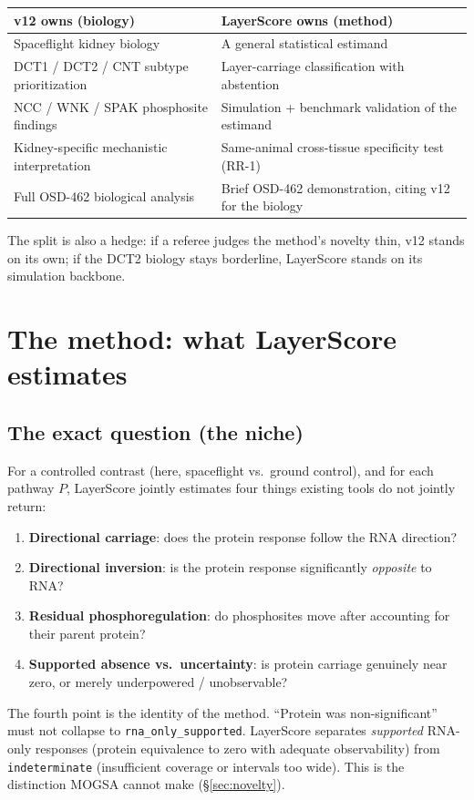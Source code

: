 \documentclass[11pt]{article}
\newcommand{\Crna}{\texttt{rna\_only\_supported}}
\newcommand{\Cind}{\texttt{indeterminate}}
\begin{document}
\begin{center}\small
\begin{tabularx}{\textwidth}{@{}L L@{}}
\toprule
\textbf{v12 owns (biology)} & \textbf{LayerScore owns (method)} \\
\midrule
Spaceflight kidney biology & A general statistical estimand \\
DCT1 / DCT2 / CNT subtype prioritization & Layer-carriage classification with abstention \\
NCC / WNK / SPAK phosphosite findings & Simulation + benchmark validation of the estimand \\
Kidney-specific mechanistic interpretation & Same-animal cross-tissue specificity test (RR-1) \\
Full OSD-462 biological analysis & Brief OSD-462 demonstration, citing v12 for the biology \\
\bottomrule
\end{tabularx}
\end{center}

\noindent The split is also a hedge: if a referee judges the method's novelty thin, v12 stands on its own;
if the DCT2 biology stays borderline, LayerScore stands on its simulation backbone.

\section{The method: what LayerScore estimates}

\subsection{The exact question (the niche)}
For a controlled contrast (here, spaceflight vs.\ ground control), and for each pathway $P$, LayerScore
jointly estimates four things existing tools do not jointly return:
\begin{enumerate}
\item \textbf{Directional carriage}: does the protein response follow the RNA direction?
\item \textbf{Directional inversion}: is the protein response significantly \emph{opposite} to RNA?
\item \textbf{Residual phosphoregulation}: do phosphosites move after accounting for their parent protein?
\item \textbf{Supported absence vs.\ uncertainty}: is protein carriage genuinely near zero, or merely
underpowered / unobservable?
\end{enumerate}
The fourth point is the identity of the method. ``Protein was non-significant'' must not collapse to
\Crna{}. LayerScore separates \emph{supported} RNA-only responses (protein equivalence to zero with
adequate observability) from \Cind{} (insufficient coverage or intervals too wide). This is the distinction
MOGSA cannot make (\S\ref{sec:novelty}).
\end{document}
